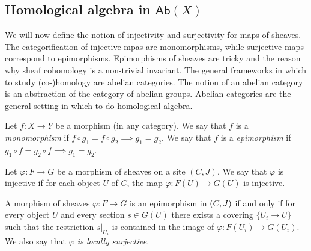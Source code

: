 \subsection{Homological algebra in \texorpdfstring{$\mathsf{Ab}(X)$}{Ab(X)}}

We will now define the notion of injectivity and surjectivity for maps of sheaves. The categorification of injective mpas are monomorphisms, while surjective maps correspond to epimorphisms. Epimorphisms of sheaves are tricky and the reason why sheaf cohomology is a non-trivial invariant. The general frameworks in which to study (co-)homology are abelian categories. The notion of an abelian category is an abstraction of the category of abelian groups. Abelian categories are the general setting in which to do homological algebra.

\begin{definition}
	Let $f: X \to Y$ be a morphism (in any category). We say that $f$ is a \textit{monomorphism} if $f \circ g_1 = f \circ g_2 \implies g_1 = g_2$.
	We say that $f$ is a \textit{epimorphism} if $g_1 \circ  f  = g_2 \circ f \implies g_1 = g_2$.
\end{definition}

\begin{proposition}[Monomorphisms in $\sh(C,J)$]
	Let $\varphi: F \to G$ be a morphism of sheaves on a site $(C,J)$. We say that $\varphi$ is injective if for each object $U$ of $C$, the map $\varphi: F(U) \to G(U)$ is injective.
\end{proposition}

\begin{proposition}[Epimorphisms in $\sh(C,J)$]
	A morphism of sheaves $\varphi: F \to G$ is an epimorphism in $\mathcal{(}C,J)$ if and only if for every object $U$ and every section $s \in G(U)$ there exists a covering $\{U_i \to U\}$ such that the restriction $s|_{U_i}$ is contained in the image of $\varphi: F(U_i) \to G(U_i)$. We also say that \textit{$\varphi$ is locally surjective}.
\end{proposition}


